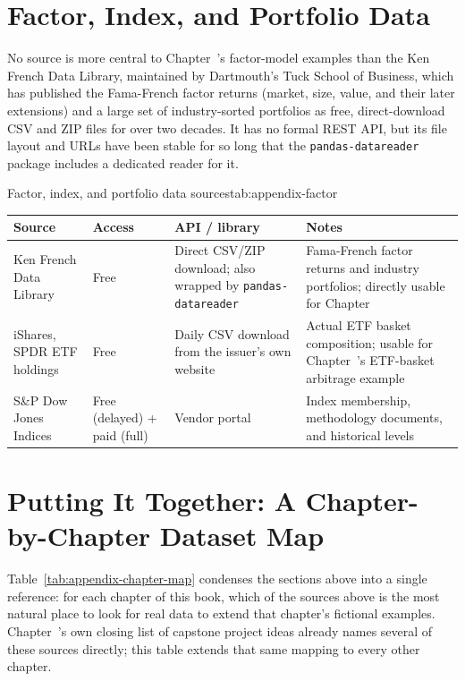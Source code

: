 \documentclass[../ai_in_finance]{subfiles}
\begin{document}
\section{Factor, Index, and Portfolio Data}

No source is more central to Chapter~'s factor-model examples than the Ken French Data Library, maintained by Dartmouth's Tuck School of Business, which has published the Fama-French factor returns (market, size, value, and their later extensions) and a large set of industry-sorted portfolios as free, direct-download CSV and ZIP files for over two decades. It has no formal REST API, but its file layout and URLs have been stable for so long that the \texttt{pandas-datareader} package includes a dedicated reader for it.

\begin{booktable}[htbp]{Factor, index, and portfolio data sources}{tab:appendix-factor}
\begin{tabular}{L{3.0cm}L{2.6cm}L{3.6cm}L{3.2cm}}
\toprule
Source & Access & API / library & Notes \\
\midrule
Ken French Data Library & Free & Direct CSV/ZIP download; also wrapped by \texttt{pandas-datareader} & Fama-French factor returns and industry portfolios; directly usable for Chapter~ \\
iShares, SPDR ETF holdings & Free & Daily CSV download from the issuer's own website & Actual ETF basket composition; usable for Chapter~'s ETF-basket arbitrage example \\
S\&P Dow Jones Indices & Free (delayed) + paid (full) & Vendor portal & Index membership, methodology documents, and historical levels \\
\bottomrule
\end{tabular}
\end{booktable}

\section{Putting It Together: A Chapter-by-Chapter Dataset Map}

Table~\ref{tab:appendix-chapter-map} condenses the sections above into a single reference: for each chapter of this book, which of the sources above is the most natural place to look for real data to extend that chapter's fictional examples. Chapter~'s own closing list of capstone project ideas already names several of these sources directly; this table extends that same mapping to every other chapter.
\end{document}
